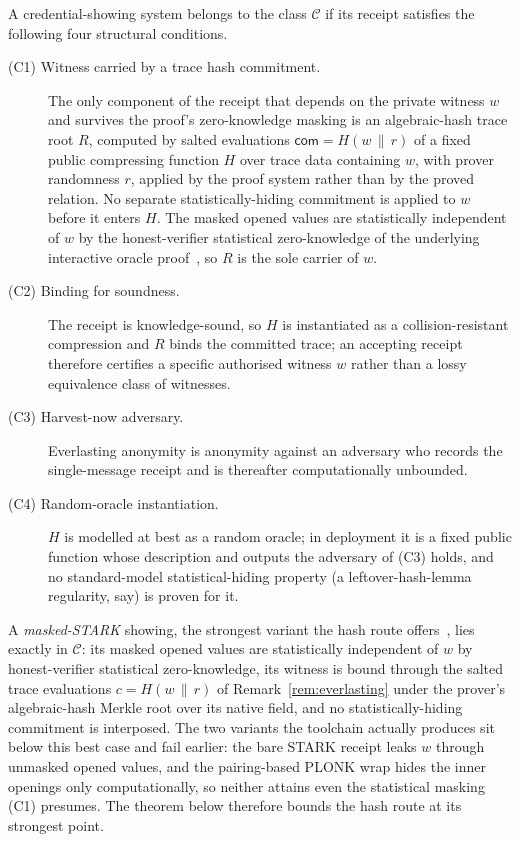 \begin{definition}\label{def:class-C}
    A credential-showing system belongs to the class $\mathcal C$ if its receipt
    satisfies the following four structural conditions.
    \begin{description}
      \item[(C1) Witness carried by a trace hash commitment.] The only component of the receipt that depends on the private witness $w$ and survives the proof's zero-knowledge masking is an algebraic-hash trace root $R$, computed by salted evaluations $\mathsf{com}=H(w\,\|\,r)$ of a fixed public compressing function $H$ over trace data containing $w$, with prover randomness $r$, applied by the proof system rather than by the proved relation. No separate statistically-hiding commitment is applied to $w$ before it enters $H$. The masked opened values are statistically independent of $w$ by the honest-verifier statistical zero-knowledge of the underlying interactive oracle proof~\cite{cryptoeprint:2024/1037}, so $R$ is the sole carrier of $w$.
      \item[(C2) Binding for soundness.] The receipt is knowledge-sound, so $H$ is instantiated as a collision-resistant compression and $R$ binds the committed trace; an accepting receipt therefore certifies a specific authorised witness $w$ rather than a lossy equivalence class of witnesses.
      \item[(C3) Harvest-now adversary.] Everlasting anonymity is anonymity against an adversary who records the single-message receipt and is thereafter computationally unbounded.
      \item[(C4) Random-oracle instantiation.] $H$ is modelled at best as a random oracle; in deployment it is a fixed public function whose description and outputs the adversary of (C3) holds, and no standard-model statistical-hiding property (a leftover-hash-lemma regularity, say) is proven for it.
    \end{description}
    A \emph{masked-STARK} showing, the strongest variant the hash route offers~\cite{cryptoeprint:2024/1037}, lies exactly in $\mathcal C$: its masked opened values are statistically independent of $w$ by honest-verifier statistical zero-knowledge, its witness is bound through the salted trace evaluations $c=H(w\,\|\,r)$ of Remark~\ref{rem:everlasting} under the prover's algebraic-hash Merkle root over its native field, and no statistically-hiding commitment is interposed. The two variants the toolchain actually produces sit below this best case and fail earlier: the bare STARK receipt leaks $w$ through unmasked opened values, and the pairing-based PLONK wrap hides the inner openings only computationally, so neither attains even the statistical masking (C1) presumes. The theorem below therefore bounds the hash route at its strongest point.
\end{definition}

